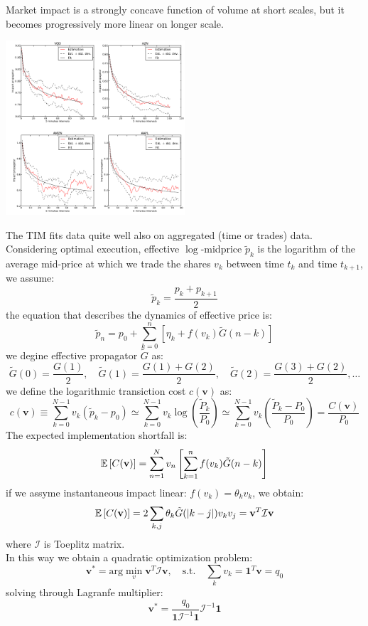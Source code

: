 Market impact is a strongly concave function of volume at short scales, but it becomes progressively more linear on longer scale.
\begin{center}
	\includegraphics[width=0.5\textwidth]{picture/(12)market_impact_3.png}
\end{center}
The TIM fits data quite well also on aggregated (time or trades) data.\\
Considering optimal execution, effective $\log$-midprice $\tilde{p}_k$ is the logarithm of the average mid-price at which we trade the shares $v_k$ between time $t_k$ and time $t_{k+1}$, we assume:
\[
\tilde{p}_k = \frac{p_k + p_{k+1}}{2}
\]
the equation that describes the dynamics of effective price is:
\[
\tilde{p}_n = p_0 + \sum_{k=0}^{n} [\eta_k + f(v_k) \tilde{G}(n-k)]
\]
we degine effective propagator $\tilde{G}$ as:
\[
\tilde{G}(0) = \frac{G(1)}{2}, \quad \tilde{G}(1) = \frac{G(1) + G(2)}{2}, \quad \tilde{G}(2) = \frac{G(3)+G(2)}{2}, \ldots
\]
we define the logarithmic transiction cost $c(\mathbf{v})$ as:
\[
c(\mathbf{v}) \equiv \sum_{k=0}^{N-1} v_k (\tilde{p}_k - p_0) \simeq \sum_{k=0}^{N-1} v_k \log \left(\frac{\tilde{P}_k}{P_0}\right) \simeq \sum_{k=0}^{N-1}v_k \left(\frac{\tilde{P}_k - P_0}{P_0}\right) = \frac{C(\mathbf{v})}{P_0}
\]
The expected implementation shortfall is:
\[
\mathbb{E}\left[C(\mathbf{v})\right] = \sum_{n=1}^{N}v_n \left[\sum_{k=1}^{n} f(v_k) \tilde{G}(n-k)\right]
\]
if we assyme instantaneous impact linear: $f(v_k) = \theta_kv_k$, we obtain:
\[
\mathbb{E}\left[C(\mathbf{v})\right] = 2\sum_{k,j}\theta_k \tilde{G}(|k-j|) v_kv_j = \mathbf{v}^T\mathcal{I}\mathbf{v}
\]
where $\mathcal{I}$ is Toeplitz matrix.\\
In this way we obtain a quadratic optimization problem:
\[
\textbf{v}^* = \text{arg}\min_{v} \mathbf{v}^T\mathcal{I}\mathbf{v}, \quad \text{s.t.} \quad \sum_k v_k = \textbf{1}^T\textbf{v} = q_0
\]
solving through Lagranfe multiplier:
\[
\textbf{v}^* = \frac{q_0}{\mathbf{1}\mathcal{I}^{-1}\mathbf{1}}\mathcal{I}^{-1}\mathbf{1}
\]
